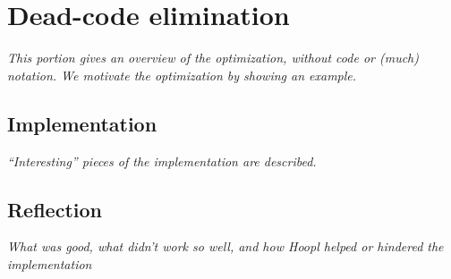 \documentclass[12pt]{report}
\begin{document}


\chapter{Dead-code elimination}



\emph{This portion gives an overview of the optimization, without
code or (much) notation. We motivate the optimization by 
showing an example.}

\section{Implementation}
\emph{``Interesting'' pieces of the implementation are described.}

\section{Reflection}
\emph{What was good, what didn't work so well, and how Hoopl helped
or hindered the implementation}
\end{document}

